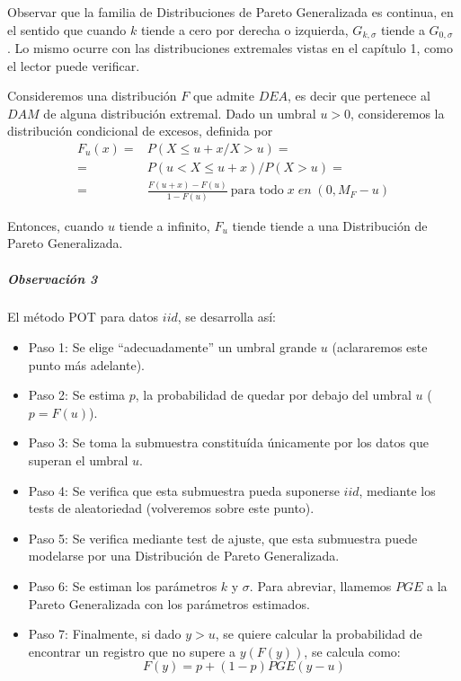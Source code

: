 \documentclass[
  12pt]{article}
\begin{document}
Observar que la familia de Distribuciones de Pareto Generalizada es
continua, en el sentido que cuando \(k\) tiende a cero por derecha o
izquierda, \(G_{k,\sigma}\) tiende a \(G_{0,\sigma}\) . Lo mismo ocurre
con las distribuciones extremales vistas en el capítulo 1, como el
lector puede verificar.

\begin{theorem}
Consideremos una distribución $F$ que admite $DEA$, es decir que pertenece al $DAM$ de alguna distribución extremal. Dado un umbral $u>0$, consideremos la distribución condicional de excesos, definida por
\begin{align}
F_u(x)= &P(X \leq  u+x/ X>u)= \nonumber \\
=&P(u<X \leq u+x)/P(X>u)= \nonumber \\
=&\frac{F(u+x)-F(u)}{1-F(u)}\:\text{para todo}\; x\; en\;(0,M_{F}-u)
\end{align}
\end{theorem}

Entonces, cuando \(u\) tiende a infinito, \(F_u\) tiende tiende a una
Distribución de Pareto Generalizada.

\subparagraph{Observación 3}\label{observaciuxf3n-3}

El método POT para datos \(iid\), se desarrolla así:

\begin{itemize}
\item Paso 1: Se elige “adecuadamente” un umbral grande $u$ (aclararemos este punto más adelante).
\item Paso 2: Se estima $p$, la probabilidad de quedar por debajo del umbral $u$ ($p=F(u)$).
\item Paso 3: Se toma la submuestra constituída únicamente por los datos que superan el umbral $u$.
\item Paso 4: Se verifica que esta submuestra pueda suponerse $iid$, mediante los tests de aleatoriedad (volveremos sobre este punto).
\item Paso 5: Se verifica mediante test de ajuste, que esta submuestra puede modelarse por una Distribución de Pareto Generalizada.
\item Paso 6: Se estiman los parámetros $k$ y $\sigma$. Para abreviar, llamemos $PGE$ a la Pareto Generalizada con los parámetros estimados.
\item Paso 7: Finalmente, si dado $y >u$, se quiere calcular la probabilidad de encontrar un registro que no supere a $y (F(y))$, se calcula como:
\begin{equation}
F(y)=p +(1-p)PGE(y-u)
\end{equation}
\end{itemize}
\end{document}
